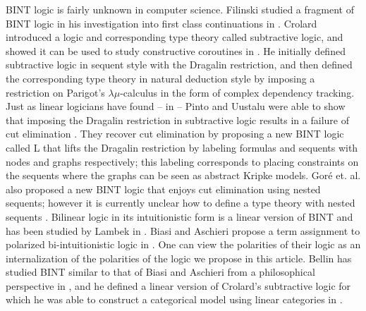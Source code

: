 BINT logic is fairly unknown in computer science.  Filinski studied a
fragment of BINT logic in his investigation into first class
continuations in \cite{Filinski:1989}.  Crolard introduced a logic and
corresponding type theory called subtractive logic, and showed it can
be used to study constructive coroutines in
\cite{crolard01,Crolard:2004}.  He initially defined subtractive logic
in sequent style with the Dragalin restriction, and then defined the
corresponding type theory in natural deduction style by imposing a
restriction on Parigot's $\lambda\mu$-calculus in the form of complex
dependency tracking.  Just as linear logicians have found -- in
\cite{Schellinx:1991} -- Pinto and Uustalu were able to show that
imposing the Dragalin restriction in subtractive logic results in a
failure of cut elimination \cite{Pinto:2009}.  They recover cut
elimination by proposing a new BINT logic called L that lifts the
Dragalin restriction by labeling formulas and sequents with nodes and
graphs respectively; this labeling corresponds to placing constraints
on the sequents where the graphs can be seen as abstract Kripke
models. Gor\'e et. al. also proposed a new BINT logic that enjoys cut
elimination using nested sequents; however it is currently unclear how
to define a type theory with nested sequents
\cite{DBLP:conf/aiml/GorePT08}.  Bilinear logic in its intuitionistic
form is a linear version of BINT and has been studied by Lambek in
\cite{Lambek:1993,Lambek:1995}.  Biasi and Aschieri propose a term
assignment to polarized bi-intuitionistic logic in
\cite{Biasi:2008:TAP:2365856.2365859}.  One can view the polarities of
their logic as an internalization of the polarities of the logic we
propose in this article. Bellin has studied BINT similar to that of
Biasi and Aschieri from a philosophical perspective in
\cite{Bellin:2004,Bellin:2005,Bellin:2014}, and he defined a linear
version of Crolard's subtractive logic for which he was able to
construct a categorical model using linear categories in
\cite{Bellin:2012}.

